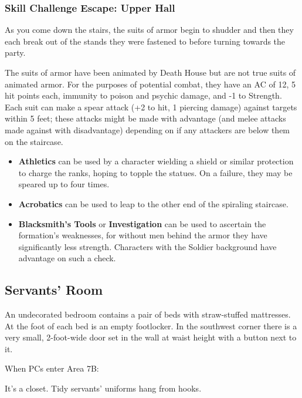 \subsubsection*{Skill Challenge Escape: Upper Hall}
\label{sec:SC_UpperHall}
\begin{readout}
  As you come down the stairs, the suits of armor begin to shudder and then they each break out of the stands
  they were fastened to before turning towards the party.
\end{readout}
The suits of armor have been animated by Death House but are not true suits of animated armor. For the purposes
of potential combat, they have an AC of 12, 5 hit points each, immunity to poison and psychic damage, and -1 to
Strength. Each suit can make a spear attack (+2 to hit, 1 piercing damage) against targets within 5 feet; these
attacks might be made with advantage (and melee attacks made against with disadvantage) depending on if any attackers are below them on the staircase.
\begin{skillChallenge}
  \begin{itemize}
    \item \textbf{Athletics} can be used by a character wielding a shield or similar protection to charge the
    ranks, hoping to topple the statues. On a failure, they may be speared up to four times. \moderateDC
    \item \textbf{Acrobatics} can be used to leap to the other end of the spiraling staircase. \moderateDC
    \item \textbf{Blacksmith's Tools} or \textbf{Investigation} can be used to ascertain the formation's 
    weaknesses, for without men behind the armor they have significantly less strength. Characters with the 
    Soldier background have advantage on such a check. \moderateDC
  \end{itemize}
\end{skillChallenge}


\pagebreak
\subsection{Servants' Room}
\label{sec:ServantsRoom}
\begin{readout}
  An undecorated bedroom contains a pair of beds with straw-stuffed mattresses. At the foot of each bed is
  an empty footlocker. In the southwest corner there is a very small, 2-foot-wide door set in the wall 
  at waist height with a button next to it.
\end{readout}
When PCs enter Area 7B:
\begin{readout}
  It's a closet. Tidy servants' uniforms hang from hooks.
\end{readout}


